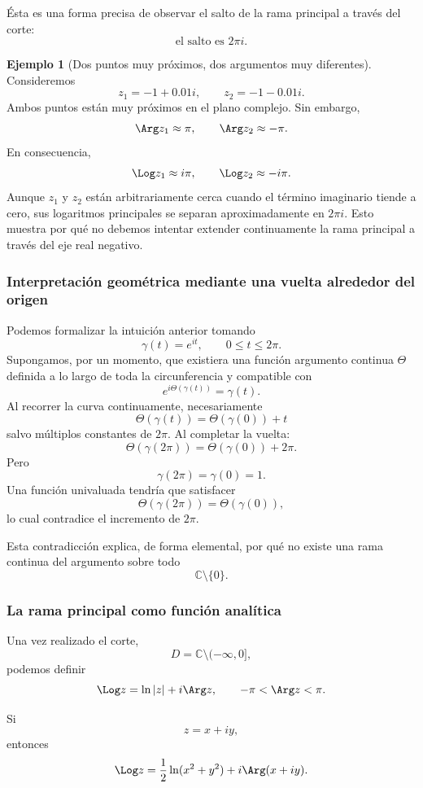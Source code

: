 \documentclass[12pt]{article}
\theoremstyle{definition}
\newtheorem{ejemplo}{Ejemplo}[section]
\theoremstyle{remark}
\begin{document}
Ésta es una forma precisa de observar el salto de la rama principal a través
del corte:
\[
\boxed{\text{el salto es }2\pi i.}
\]

\begin{ejemplo}[Dos puntos muy próximos, dos argumentos muy diferentes]
Consideremos
\[
z_1=-1+0.01i,
\qquad
z_2=-1-0.01i.
\]
Ambos puntos están muy próximos en el plano complejo. Sin embargo,
\[
\Arg z_1\approx\pi,
\qquad
\Arg z_2\approx-\pi.
\]
En consecuencia,
\[
\Log z_1\approx i\pi,
\qquad
\Log z_2\approx-i\pi.
\]
Aunque $z_1$ y $z_2$ están arbitrariamente cerca cuando el término imaginario
tiende a cero, sus logaritmos principales se separan aproximadamente en
$2\pi i$. Esto muestra por qué no debemos intentar extender continuamente la
rama principal a través del eje real negativo.
\end{ejemplo}

\subsubsection{Interpretación geométrica mediante una vuelta alrededor del origen}

Podemos formalizar la intuición anterior tomando
\[
\gamma(t)=e^{it},
\qquad0\leq t\leq2\pi.
\]
Supongamos, por un momento, que existiera una función argumento continua
$\Theta$ definida a lo largo de toda la circunferencia y compatible con
\[
e^{i\Theta(\gamma(t))}=\gamma(t).
\]
Al recorrer la curva continuamente, necesariamente
\[
\Theta(\gamma(t))=\Theta(\gamma(0))+t
\]
salvo múltiplos constantes de $2\pi$. Al completar la vuelta:
\[
\Theta(\gamma(2\pi))
=
\Theta(\gamma(0))+2\pi.
\]
Pero
\[
\gamma(2\pi)=\gamma(0)=1.
\]
Una función univaluada tendría que satisfacer
\[
\Theta(\gamma(2\pi))
=
\Theta(\gamma(0)),
\]
lo cual contradice el incremento de $2\pi$.

Esta contradicción explica, de forma elemental, por qué no existe una rama
continua del argumento sobre todo
\[
\mathbb C\setminus\{0\}.
\]

\subsubsection{La rama principal como función analítica}

Una vez realizado el corte,
\[
D=\mathbb C\setminus(-\infty,0],
\]
podemos definir
\[
\Log z=\ln|z|+i\Arg z,
\qquad -\pi<\Arg z<\pi.
\]

Si
\[
z=x+iy,
\]
entonces
\[
\Log z
=
\frac12\ln(x^2+y^2)
+i\Arg(x+iy).
\]
\end{document}
